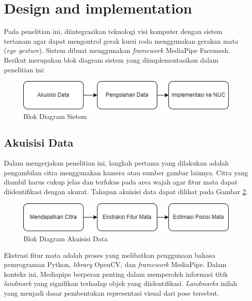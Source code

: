 \section{Design and implementation}
\label{sec:designandimplementation}

Pada penelitian ini, diintegrasikan teknologi visi komputer dengan sistem tertanam agar dapat mengontrol gerak kursi roda menggunakan gerakan mata (\emph{eye gesture}). Sistem dibuat menggunakan \emph{framework} MediaPipe Facemesh. Berikut merupakan blok diagram sistem yang diimplementasikan dalam penelitian ini:

\begin{figure} [ht] \centering
  \includegraphics[scale=0.55]{gambar/paper1.png}
  \caption{Blok Diagram Sistem}
  \label{fig:sistem}
\end{figure}

\subsection{Akuisisi Data}

Dalam mengerjakan penelitian ini, langkah pertama yang dilakukan adalah pengambilan citra menggunakan kamera atau sumber gambar lainnya. Citra yang diambil harus cukup jelas dan terfokus pada area wajah agar fitur mata dapat diidentifikasi dengan akurat. Tahapan akuisisi data dapat dilihat pada Gambar \ref{fig:akuisisi}.

\begin{figure} [ht] \centering
  \includegraphics[scale=0.55]{gambar/paper2.png}
  \caption{Blok Diagram Akuisisi Data}
  \label{fig:akuisisi}
\end{figure}

Ekstrasi fitur mata adalah proses yang melibatkan penggunaan bahasa pemrograman Python, \emph{library} OpenCV, dan \emph{framework} MediaPipe. Dalam konteks ini, Mediapipe berperan penting dalam memperoleh informasi titik \emph{landmark} yang signifikan terhadap objek yang diidentifikasi. \emph{Landmarks} inilah yang menjadi dasar pembentukan representasi visual dari pose tersebut.

